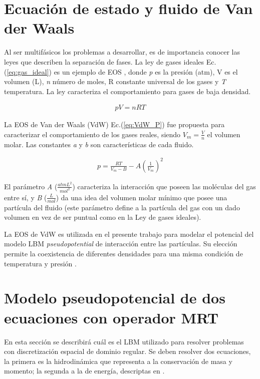 \section{Ecuación de estado y fluido de Van der Waals}

Al ser multifásicos los problemas a desarrollar, es de importancia conocer las leyes que describen la separación de fases. La ley de gases ideales Ec. (\ref{eq:gas_ideal}) es un ejemplo de EOS , donde \textit{p} es la presión (atm), V es el volumen (L), \textit{n} número de moles, R constante universal de los gases y \textit{T} temperatura. La ley caracteriza el comportamiento para gases de baja densidad.

\begin{align}
p V = n R T
\label{eq:gas_ideal}
\end{align}

La EOS de Van der Waals (VdW) Ec.(\ref{eq:VdW_P}) fue propuesta para caracterizar el comportamiento de los gases reales, siendo $V_m = \frac{V}{n}$ el volumen molar. Las constantes \textit{a} y \textit{b} son características de cada fluido.

\begin{align}
p = \frac{R T}{V_m - B} - A {\left(\frac{1}{V_m}\right)}^2
\label{eq:VdW_P}
\end{align}

El parámetro \textit{A}  ($\frac{atm L^2}{mol^2}$) caracteriza la interacción que poseen las moléculas del gas entre sí, y \textit{B} ($\frac{L}{mol}$) da una idea del volumen molar mínimo que posee una partícula del fluido (este parámetro define a la partícula del gas con un dado volumen en vez de ser puntual como en la Ley de gases ideales).

La EOS de VdW es utilizada en el presente trabajo para modelar el potencial del modelo LBM \textit{pseudopotential} de interacción entre las partículas. Su elección permite la coexistencia de diferentes densidades para una misma condición de temperatura y presión \cite{huang2015multiphase}. 


\section{Modelo pseudopotencial de dos ecuaciones con operador MRT}
\label{sec:LBM_2_ec_MRT}

En esta sección se describirá cuál es el LBM utilizado para resolver problemas con discretización espacial de dominio regular. Se deben resolver dos ecuaciones, la primera es la hidrodinámica que representa a la conservación de masa y momento; la segunda a la de energía, descriptas en \cite{fogliatto2019transferencia}.


